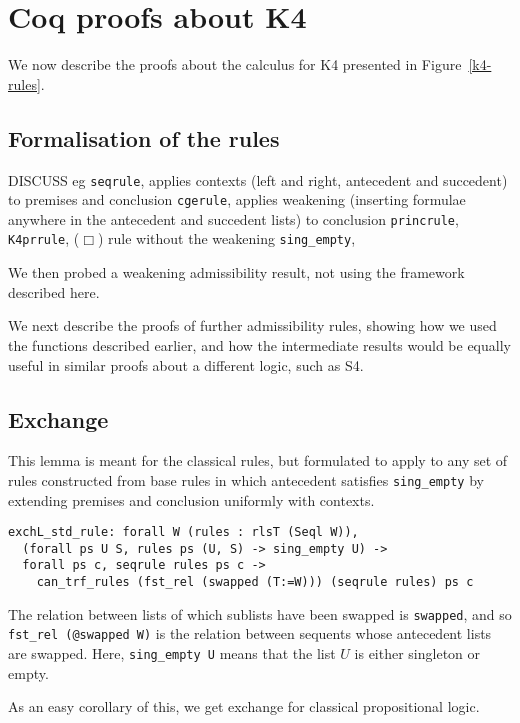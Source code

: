 \documentclass[a4paper,12pt]{llncs}
\begin{document}
\section{Coq proofs about K4}
We now describe the proofs about the calculus for K4 presented in 
Figure~\ref{k4-rules}.

\subsection{Formalisation of the rules}

DISCUSS
eg \texttt{seqrule}, applies contexts (left and right, antecedent and
succedent) to premises and conclusion
\texttt{cgerule}, applies weakening (inserting formulae anywhere in the
antecedent and succedent lists) to conclusion 
\texttt{princrule}, 
\texttt{K4prrule}, ($\Box$) rule without the weakening 
\texttt{sing\_empty}, 

We then probed a weakening admissibility result, not using the framework
described here.

We next describe the proofs of further admissibility rules,
showing how we used the functions described earlier, and how the intermediate
results would be equally useful in similar proofs about a different logic,
such as S4.

\subsection{Exchange}

This lemma is meant for the classical rules, but formulated to apply to
any set of rules constructed from base rules in which antecedent satisfies
\texttt{sing\_empty} by extending premises and conclusion uniformly with
contexts.

\begin{verbatim}
exchL_std_rule: forall W (rules : rlsT (Seql W)),
  (forall ps U S, rules ps (U, S) -> sing_empty U) ->
  forall ps c, seqrule rules ps c ->
    can_trf_rules (fst_rel (swapped (T:=W))) (seqrule rules) ps c
\end{verbatim}

The relation between lists of which sublists have been swapped is
\texttt{swapped}, and so \texttt{fst\_rel (@swapped W)} is the relation between 
sequents whose antecedent lists are swapped.
Here, \texttt{sing\_empty U} means that the list $U$ is either singleton or
empty.

As an easy corollary of this, we get exchange for classical propositional
logic.
\end{document}
